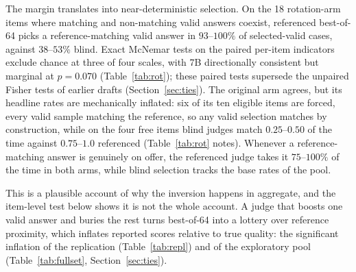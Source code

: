\documentclass[11pt]{article}
\begin{document}
The margin translates into near-deterministic selection.
On the 18 rotation-arm items where matching and non-matching valid answers coexist, referenced best-of-64 picks a reference-matching valid answer in $93$--$100\%$ of selected-valid cases, against $38$--$53\%$ blind.
Exact McNemar tests on the paired per-item indicators exclude chance at three of four scales, with 7B directionally consistent but marginal at $p = 0.070$ (Table~\ref{tab:rot}); these paired tests supersede the unpaired Fisher tests of earlier drafts (Section~\ref{sec:ties}).
The original arm agrees, but its headline rates are mechanically inflated: six of its ten eligible items are forced, every valid sample matching the reference, so any valid selection matches by construction, while on the four free items blind judges match $0.25$--$0.50$ of the time against $0.75$--$1.0$ referenced (Table~\ref{tab:rot} notes).
Whenever a reference-matching answer is genuinely on offer, the referenced judge takes it $75$--$100\%$ of the time in both arms, while blind selection tracks the base rates of the pool.

This is a plausible account of why the inversion happens in aggregate, and the item-level test below shows it is not the whole account.
A judge that boosts one valid answer and buries the rest turns best-of-64 into a lottery over reference proximity, which inflates reported scores relative to true quality: the significant inflation of the replication (Table~\ref{tab:repl}) and of the exploratory pool (Table~\ref{tab:fullset}, Section~\ref{sec:ties}).
\end{document}
